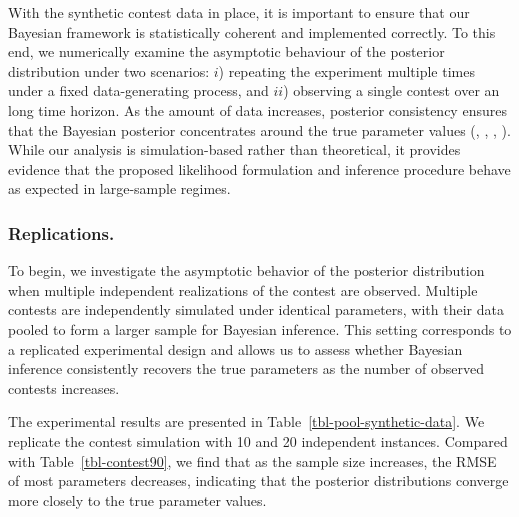 \documentclass[mnsc]{informs3}
\begin{document}
With the synthetic contest data in place, it is important to ensure that our Bayesian framework is statistically coherent and implemented correctly. 
To this end, we numerically examine the asymptotic behaviour of the posterior distribution under two scenarios:
$i$) repeating the experiment multiple times under a fixed data-generating process, and $ii$) observing a single contest over an long time horizon.
As the amount of data increases, posterior consistency ensures that the Bayesian posterior concentrates around the true parameter values (\citealt{vaart1998asymptotic}, \citealt{ghosal2000convergence}, \citealt{pokern2013posterior}, \citealt{ramamoorthi2015posterior}).
While our analysis is simulation-based rather than theoretical, it provides evidence that the proposed likelihood formulation and inference procedure behave as expected in large-sample regimes.


\subsubsection{Replications.}

To begin, we investigate the asymptotic behavior of the posterior distribution when multiple independent realizations of the contest are observed. 
Multiple contests are independently simulated under identical parameters, with their data pooled to form a larger sample for Bayesian inference.
This setting corresponds to a replicated experimental design and allows us to assess whether Bayesian inference consistently recovers the true parameters as the number of observed contests increases.

The experimental results are presented in Table~\ref{tbl-pool-synthetic-data}. 
We replicate the contest simulation with 10 and 20 independent instances. 
Compared with Table~\ref{tbl-contest90}, we find that as the sample size increases, the RMSE of most parameters decreases, indicating that the posterior distributions converge more closely to the true parameter values.
\end{document}
